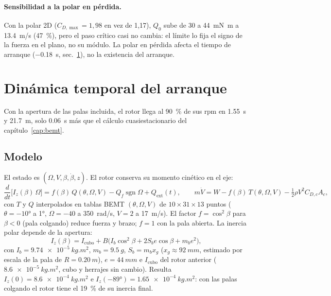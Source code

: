 \paragraph{Sensibilidad a la polar en pérdida.} Con la polar 2D ($C_{D,\max}=1{,}98$ en vez
de 1,17), $Q_0$ sube de \num{30} a \SI{44}{mN.m} a \SI{13.4}{m/s} (\SI{+47}{\percent}),
pero el paso crítico casi no cambia: el límite lo fija el signo de la fuerza en el plano, no
su módulo. La polar en pérdida afecta el tiempo de arranque (\SI{-0.18}{s},
sec.~\ref{sec:arranque-dinamica}), no la existencia del arranque.

\section{Dinámica temporal del arranque}\label{sec:arranque-dinamica}

Con la apertura de las palas incluida, el rotor llega al \SI{90}{\percent} de sus rpm en
\SI{1.55}{s} y \SI{21.7}{m}, solo \SI{0.06}{s} más que el cálculo cuasiestacionario del
capítulo~\ref{cap:bemt}.

\subsection{Modelo}

El estado es $(\Omega, V, \beta, \dot\beta, z)$. El rotor conserva su momento cinético en
el eje:
\begin{equation}
  \frac{d}{dt}\bigl[I_z(\beta)\,\Omega\bigr]=f(\beta)\,Q(\theta,\Omega,V)-Q_f\operatorname{sgn}\Omega+Q_\text{ext}(t),
  \qquad
  m\dot V=W-f(\beta)\,T(\theta,\Omega,V)-\tfrac12\rho V^2C_{D,c}A_c ,
  \label{eq:arranque-din}
\end{equation}
con $T$ y $Q$ interpolados en tablas BEMT $(\theta,\Omega,V)$ de
$10\times31\times13$ puntos ($\theta=\ang{-10}$ a \ang{+1}, $\Omega=-40$ a \SI{350}{rad/s},
$V=2$ a \SI{17}{m/s}). El factor $f=\cos^2\beta$ para $\beta<0$ (pala colgando) reduce
fuerza y brazo; $f=1$ con la pala abierta. La inercia polar depende de la apertura:
\begin{equation}
  I_z(\beta)=I_\text{cubo}+B\bigl(I_b\cos^2\beta+2S_be\cos\beta+m_be^2\bigr),
  \label{eq:arranque-iz}
\end{equation}
con $I_b=\SI{9.74e-5}{kg.m^2}$, $m_b=\SI{9.5}{g}$, $S_b=m_bx_g$ ($x_g\approx\SI{92}{mm}$,
estimado por escala de la pala de $R=\SI{0.20}{m}$), $e=\SI{44}{mm}$ e $I_\text{cubo}$ del
rotor anterior ($\SI{8.6e-5}{kg.m^2}$, cubo y herrajes sin cambio). Resulta
$I_z(0)=\SI{8.6e-4}{kg.m^2}$ e $I_z(\ang{-89})=\SI{1.65e-4}{kg.m^2}$: con las palas colgando
el rotor tiene el \SI{19}{\percent} de su inercia final.

